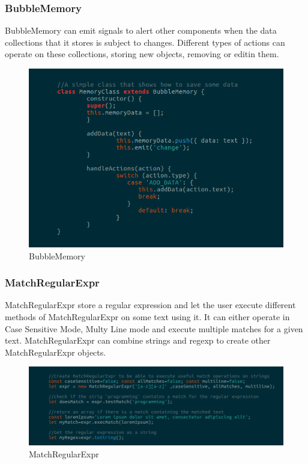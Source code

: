 \subsubsection{BubbleMemory}
BubbleMemory can emit signals to alert other components when the data collections that it stores is subject to changes. Different types of actions can operate on these collections, storing new objects, removing or editin them. 
\begin{figure}[H]
	\centering
	\includegraphics[width=14cm]{../../documenti/UserManualFramework/framework_model/4framework_model_memory.png}
	\caption{BubbleMemory}
\end{figure}

\subsubsection{MatchRegularExpr}
MatchRegularExpr store a regular expression and let the user execute different methods of MatchRegularExpr on some text using it.
It can either operate in Case Sensitive Mode, Multy Line mode and execute multiple matches for a given text.
MatchRegularExpr can combine strings and regexp to create other MatchRegularExpr objects.
\begin{figure}[H]
	\centering
	\includegraphics[width=14cm]{../../documenti/UserManualFramework/framework_model/5framework_model_regexp1.png}
	\caption{MatchRegularExpr}
\end{figure}

